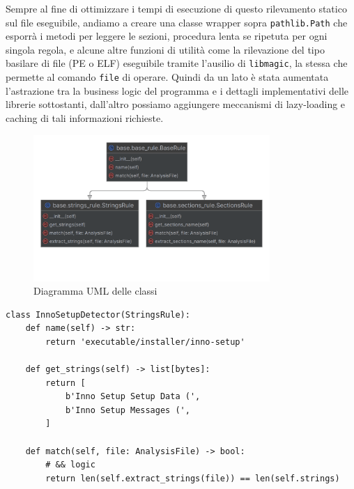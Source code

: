 Sempre al fine di ottimizzare i tempi di esecuzione di questo rilevamento statico sul file eseguibile,
andiamo a creare una classe wrapper sopra \texttt{pathlib.Path} che esporrà i metodi per leggere le sezioni, procedura lenta se ripetuta per ogni singola regola, e alcune altre funzioni di utilità come la rilevazione del tipo basilare di file (PE o ELF) eseguibile tramite l'ausilio di \texttt{libmagic}, la stessa che permette al comando \texttt{file} di operare.
Quindi da un lato è stata aumentata l'astrazione tra la business logic del programma e i dettagli implementativi delle librerie sottostanti, dall'altro possiamo aggiungere meccanismi di lazy-loading e caching di tali informazioni richieste.

\begin{figure}[H]
    \centering
    \includegraphics[width = 0.8\textwidth]{assets/base_custom_static_analyzer.png}
    \caption{Diagramma UML delle classi}
    \label{fig:base_custom_static_analyzer_uml}
\end{figure}

\begin{code}
    \begin{verbatim}
class InnoSetupDetector(StringsRule):
    def name(self) -> str:
        return 'executable/installer/inno-setup'

    def get_strings(self) -> list[bytes]:
        return [
            b'Inno Setup Setup Data (',
            b'Inno Setup Messages (',
        ]

    def match(self, file: AnalysisFile) -> bool:
        # && logic
        return len(self.extract_strings(file)) == len(self.strings)
    \end{verbatim}
    \caption{Regola di riconoscimento di InnoSetup, usando la nuova architettura}
    \label{code:enter-label}
\end{code}

